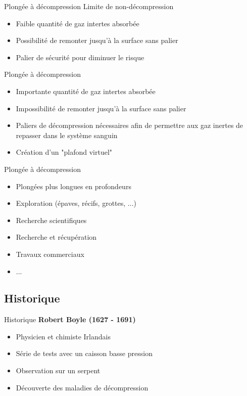 \begin{frame}{Plongée à décompression}  
	Limite de non-décompression
	\begin{itemize}
		\item Faible quantité de gaz intertes absorbée
		\item Possibilité de remonter jusqu'à la surface sans palier
		\item Palier de sécurité pour diminuer le risque
	\end{itemize}
	\vfill
	Plongée à décompression
	\begin{itemize}
		\item Importante quantité de gaz intertes absorbée
		\item Impossibilité de remonter jusqu'à la surface sans palier
		\item Paliers de décompression nécessaires afin de permettre aux gaz inertes de repasser dans le système sanguin
		\item Création d'un "plafond virtuel"
	\end{itemize}
\end{frame}

\begin{frame}{Plongée à décompression}  
	\begin{itemize}
		\item Plongées plus longues en profondeurs
		\item Exploration (épaves, récifs, grottes, ...)
		\item Recherche scientifiques
		\item Recherche et récupération
		\item Travaux commerciaux
		\item ...
	\end{itemize}
\end{frame}

\subsection{Historique}

\begin{frame}{Historique}
	\textbf{Robert Boyle (1627 - 1691)}
	\begin{itemize}
		\item Physicien et chimiste Irlandais
		\item Série de tests avec un caisson basse pression
		\item Observation sur un serpent
		\item Découverte des maladies de décompression
	\end{itemize}
\end{frame}

